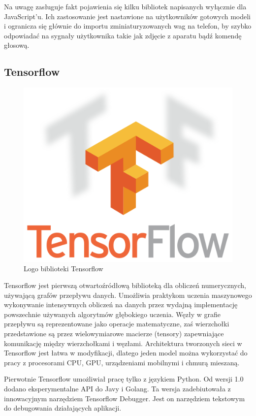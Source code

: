 \documentclass[12pt,a4paper,twoside,titlepage,openright]{book}
\begin{document}
\begin{itemize}
Na uwagę zasługuje fakt pojawienia się kilku bibliotek napisanych wyłącznie dla JavaScript'u. Ich zastosowanie jest nastawione na użytkowników gotowych modeli i ogranicza się głównie do importu zminiaturyzowanych wag na telefon, by szybko odpowiadać na sygnały użytkownika takie jak zdjęcie z aparatu bądź komendę głosową. 

\subsection{Tensorflow}
\begin{figure}[ht]
	\centering
			\includegraphics[resolution=100, scale=0.6]{Tensorflow.png}
		\caption{Logo biblioteki Tensorflow}
\end{figure}

Tensorflow jest pierwszą otwartoźródłową biblioteką dla obliczeń numerycznych, używającą grafów przepływu danych. Umożliwia praktykom uczenia maszynowego wykonywanie intensywnych obliczeń na danych przez wydajną implementację powszechnie używanych algorytmów głębokiego uczenia. Węzły w grafie przepływu są reprezentowane jako operacje matematyczne, zaś wierzchołki przedstawione są przez wielowymiarowe macierze (tensory) zapewniające komunikację między wierzchołkami i węzłami. Architektura tworzonych sieci w Tensorflow jest łatwa w modyfikacji, dlatego jeden model można wykorzystać do pracy z procesorami CPU, GPU, urządzeniami mobilnymi i chmurą mieszaną. \cite{DeepLearningTensorflow}

Pierwotnie Tensorflow umożliwiał pracę tylko z językiem Python. Od wersji 1.0 dodano eksperymentalne API do Javy i Golang. Ta wersja zadebiutowała z innowacyjnym narzędziem Tensorflow Debugger. Jest on narzędziem tekstowym do debugowania działających aplikacji.


\end{itemize}
\end{document}
